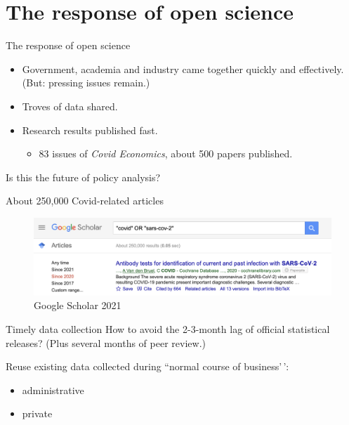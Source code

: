 \documentclass[
  ignorenonframetext,
  aspectratio=1610,
]{beamer}
\providecommand{\tightlist}{%
  \setlength{\itemsep}{0pt}\setlength{\parskip}{0pt}}
\begin{document}
\hypertarget{the-response-of-open-science}{%
\section{The response of open
science}\label{the-response-of-open-science}}

\begin{frame}{The response of open science}
\protect\hypertarget{the-response-of-open-science-1}{}
\begin{itemize}
\tightlist
\item
  Government, academia and industry came together quickly and
  effectively. (But: pressing issues remain.)
\item
  Troves of data shared.
\item
  Research results published fast.

  \begin{itemize}
  \tightlist
  \item
    83 issues of \emph{Covid Economics}, about 500 papers published.
  \end{itemize}
\end{itemize}

\begin{block}{Is this the future of policy analysis?}
\protect\hypertarget{is-this-the-future-of-policy-analysis}{}
\end{block}
\end{frame}

\begin{frame}{About 250,000 Covid-related articles}
\protect\hypertarget{about-250000-covid-related-articles}{}
\begin{figure}
\centering
\includegraphics{exhibit/fig/google-scholar.png}
\caption{Google Scholar 2021}
\end{figure}
\end{frame}

\begin{frame}{Timely data collection}
\protect\hypertarget{timely-data-collection}{}
How to avoid the 2-3-month lag of official statistical releases? (Plus
several months of peer review.)

Reuse existing data collected during ``normal course of business'\,':

\begin{itemize}
\tightlist
\item
  administrative
\item
  private
\end{itemize}
\end{frame}
\end{document}
